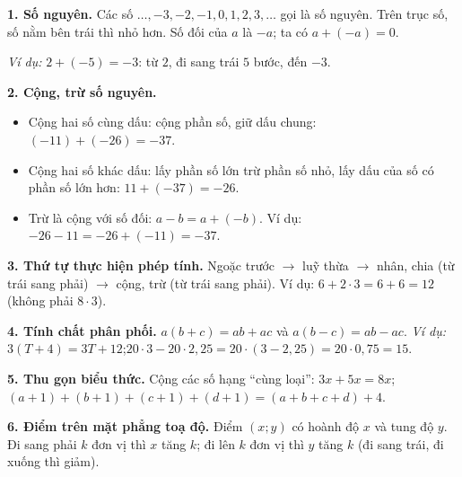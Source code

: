 \begin{knowbox}
\textbf{1. Số nguyên.} Các số $\dots,-3,-2,-1,0,1,2,3,\dots$ gọi là số nguyên. Trên trục số, số nằm bên
trái thì nhỏ hơn. Số đối của $a$ là $-a$; ta có $a+(-a)=0$.
\begin{center}\end{center}
\emph{Ví dụ:} $2+(-5)=-3$: từ $2$, đi sang trái $5$ bước, đến $-3$.

\textbf{2. Cộng, trừ số nguyên.}
\begin{itemize}[leftmargin=1.4em,itemsep=1pt,topsep=2pt]
\item Cộng hai số cùng dấu: cộng phần số, giữ dấu chung: $(-11)+(-26)=-37$.
\item Cộng hai số khác dấu: lấy phần số lớn trừ phần số nhỏ, lấy dấu của số có phần số lớn hơn: $11+(-37)=-26$.
\item Trừ là cộng với số đối: $a-b=a+(-b)$. Ví dụ: $-26-11=-26+(-11)=-37$.
\end{itemize}

\textbf{3. Thứ tự thực hiện phép tính.} Ngoặc trước $\to$ luỹ thừa $\to$ nhân, chia (từ trái sang phải)
$\to$ cộng, trừ (từ trái sang phải). Ví dụ: $6+2\cdot 3=6+6=12$ (không phải $8\cdot 3$).

\textbf{4. Tính chất phân phối.} $a(b+c)=ab+ac$ và $a(b-c)=ab-ac$.
\emph{Ví dụ:} $3(T+4)=3T+12$;\quad $20\cdot 3-20\cdot 2{,}25=20\cdot(3-2{,}25)=20\cdot 0{,}75=15$.

\textbf{5. Thu gọn biểu thức.} Cộng các số hạng ``cùng loại'': $3x+5x=8x$; \
$(a+1)+(b+1)+(c+1)+(d+1)=(a+b+c+d)+4$.

\textbf{6. Điểm trên mặt phẳng toạ độ.} Điểm $(x;y)$ có hoành độ $x$ và tung độ $y$. Đi sang phải $k$
đơn vị thì $x$ tăng $k$; đi lên $k$ đơn vị thì $y$ tăng $k$ (đi sang trái, đi xuống thì giảm).
\end{knowbox}

